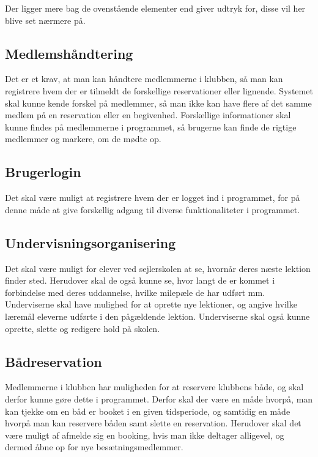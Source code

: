 Der ligger mere bag de ovenstående elementer end  giver udtryk for, disse vil her blive set nærmere på.

\subsection{Medlemshåndtering} 

Det er et krav, at man kan håndtere medlemmerne i klubben, så man kan registrere hvem der er tilmeldt de forskellige reservationer eller lignende.
Systemet skal kunne kende forskel på medlemmer, så man ikke kan have flere af det samme medlem på en reservation eller en begivenhed.
Forskellige informationer skal kunne findes på medlemmerne i programmet, så brugerne kan finde de rigtige medlemmer og markere, om de mødte op.

\subsection{Brugerlogin}
Det skal være muligt at registrere hvem der er logget ind i programmet, for på denne måde at give forskellig adgang til diverse funktionaliteter i programmet.

\subsection{Undervisningsorganisering}

Det skal være muligt for elever ved sejlerskolen at se, hvornår deres næste lektion finder sted.
Herudover skal de også kunne se, hvor langt de er kommet i forbindelse med deres uddannelse, hvilke milepæle de har udført mm.
Underviserne skal have mulighed for at oprette nye lektioner, og angive hvilke læremål eleverne udførte i den pågældende lektion. 
Underviserne skal også kunne oprette, slette og redigere hold på skolen. 

\subsection{Bådreservation}

Medlemmerne i klubben har muligheden for at reservere klubbens både, og skal derfor kunne gøre dette i programmet.
Derfor skal der være en måde hvorpå, man kan tjekke om en båd er booket i en given tidsperiode, og samtidig en måde hvorpå man kan reservere båden samt slette en reservation.
Herudover skal det være muligt af afmelde sig en booking, hvis man ikke deltager alligevel, og dermed åbne op for nye besætningsmedlemmer.


